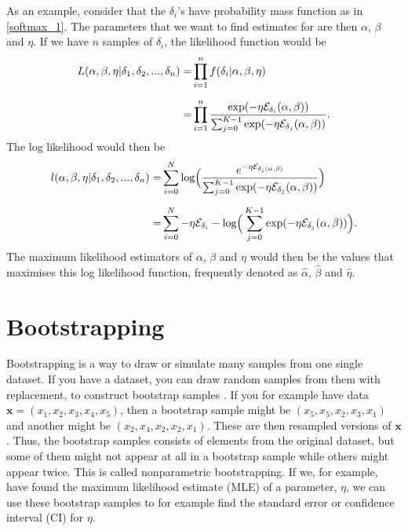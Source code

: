 As an example, consider that the $\delta_i$'s have probability mass function as in \eqref{softmax_1}. The parameters that we want to find estimates for are then $\alpha$, $\beta$ and $\eta$. If we have $n$ samples of $\delta_i$, the likelihood function would be
\begin{equation*}
    \begin{aligned}
        L(\alpha,\beta,\eta|\delta_1,\delta_2,...,\delta_n) 
        =& \prod_{i=1}^{n} f(\delta_i|\alpha,\beta,\eta)\\[6pt]
        =& \prod_{i=1}^{n} \frac{\text{exp}(- \eta \mathcal{E}_{\delta_i}(\alpha,\beta))}{\sum_{j=0}^{K-1} \text{exp}(-\eta \mathcal{E}_{\delta_j}(\alpha,\beta))}.
    \end{aligned}
\end{equation*}
The log likelihood would then be
\begin{equation*}
    \begin{aligned}
        l(\alpha,\beta,\eta|\delta_1,\delta_2,...,\delta_n) =& \sum_{i=0}^N \text{log}\Big( \frac{e^{-\eta \mathcal{E}_{\delta_{i}(\alpha,\beta)}}}
        {\sum_{j=0}^{K-1} \text{exp}(-\eta \mathcal{E}_{\delta_j}(\alpha,\beta))}\Big) \\[6pt]
        =& \sum_{i=0}^N -\eta \mathcal{E}_{\delta_{i}} 
        - \text{log}\Big(\sum_{j=0}^{K-1} \text{exp}(-\eta \mathcal{E}_{\delta_j}(\alpha,\beta))\Big).
    \end{aligned}
\end{equation*}
The maximum likelihood estimators of $\alpha$, $\beta$ and $\eta$ would then be the values that maximises this log likelihood function, frequently denoted as $\hat{\alpha}$, $\hat{\beta}$ and $\hat{\eta}$.




\section{Bootstrapping}
\label{section_theory_bootstrap}
Bootstrapping is a way to draw or simulate many samples from one single dataset. If you have a dataset, you can draw random samples from them with replacement, to construct bootstrap samples \citep{bootstrap}. 
If you for example have data $\textbf{x}=(x_1,x_2,x_3,x_4,x_{5})$, then a bootstrap sample might be $(x_5,x_5,x_2,x_3,x_1)$ and another might be $(x_2,x_{4},x_{2},x_{2},x_{1})$. These are then resampled versions of $\textbf{x}$. Thus, the bootstrap samples consists of elements from the original dataset, but some of them might not appear at all in a bootstrap sample while others might appear twice. This is called nonparametric bootstrapping. If we, for example, have found the maximum likelihood estimate (MLE) of a parameter, $\eta$, we can use these bootstrap samples to for example find the standard error or confidence interval (CI) for $\eta$.

